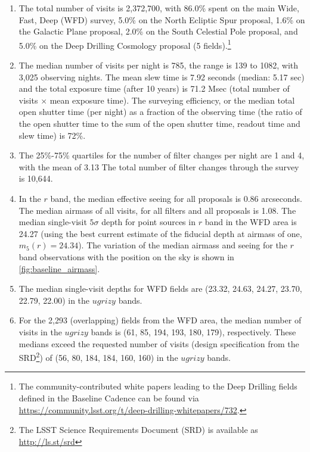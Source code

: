 \documentclass[DM,lsstdraft,authoryear,toc]{lsstdoc}
\begin{document}
\begin{enumerate}
\item The total number of visits is 2,372,700, with 86.0\% spent on
the main Wide, Fast, Deep (WFD) survey, 5.0\% on the
North Ecliptic Spur proposal, 1.6\% on the Galactic Plane proposal, 2.0\%
on the South Celestial Pole proposal, and 5.0\% on the Deep Drilling
Cosmology proposal (5 fields).\footnote{The community-contributed white papers leading to the
Deep Drilling fields defined in the Baseline Cadence can be found via
\url{https://community.lsst.org/t/deep-drilling-whitepapers/732}.}

\item The median number of visits per night is 785, the range is
139 to 1082, with 3,025 observing nights. The mean slew time is 7.92
seconds (median: 5.17 sec) and the total exposure time (after 10 years) is 71.2 Msec (total number of visits $\times$ mean exposure time).
The surveying efficiency, or the median total open shutter time (per night)
as a fraction of the observing time (the ratio of the open shutter time to
the sum of the open shutter time, readout time and slew time) is 72\%.

\item The 25\%-75\% quartiles for the number of filter changes per night are 1
and 4, with the mean of 3.13 The total number of filter changes through the survey is 10,644.

\item In the $r$ band, the median effective seeing for all proposals is 0.86 arcseconds.
The median airmass of all visits, for all filters and all proposals is 1.08.
The median single-visit $5\sigma$ depth for point sources in $r$ band in the WFD area is 24.27 (using the best
current estimate of the fiducial depth at airmass of one, $m_5(r)=24.34$).
The variation of the median airmass and seeing for the $r$
band observations with the position on the sky is shown in
\autoref{fig:baseline_airmass}.

\item The median single-visit depths for WFD fields are (23.32, 24.63, 24.27,
23.70, 22.79, 22.00) in the $ugrizy$ bands.

\item For the 2,293 (overlapping) fields from the WFD area,
the median number of visits in the $ugrizy$ bands is (61, 85, 194, 193, 180,
179), respectively. These medians exceed the requested
number of visits (design specification from the SRD\footnote{The LSST
Science Requirements Document (SRD) is available as
\url{http://ls.st/srd}}) of (56, 80, 184, 184, 160, 160) in the $ugrizy$
bands.


\end{enumerate}
\end{document}
